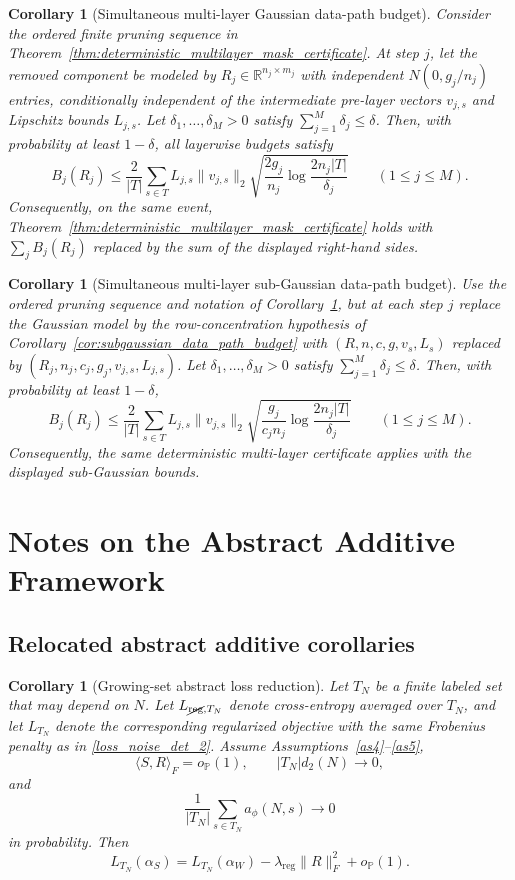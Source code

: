 \documentclass[11pt]{article}
\theoremstyle{plain}
\newtheorem{cor}[thm]{Corollary}
\theoremstyle{definition}
\theoremstyle{remark}
\newcommand{\R}{\mathbb{R}}
\newcommand{\PP}{\mathbb{P}}
\newcommand{\1}{\mathbf{1}}
\begin{document}
\begin{cor}[Simultaneous multi-layer Gaussian data-path budget]
\label{cor:multilayer_gaussian_data_path_budget}
Consider the ordered finite pruning sequence in Theorem~\ref{thm:deterministic_multilayer_mask_certificate}. At step \(j\), let the removed component be modeled by \(R_j\in\R^{n_j\times m_j}\) with independent \(N(0,g_j/n_j)\) entries, conditionally independent of the intermediate pre-layer vectors \(v_{j,s}\) and Lipschitz bounds \(L_{j,s}\). Let \(\delta_1,\dots,\delta_M>0\) satisfy \(\sum_{j=1}^M\delta_j\le\delta\). Then, with probability at least \(1-\delta\), all layerwise budgets satisfy
\[
B_j(R_j)
\le
\frac2{|T|}
\sum_{s\in T}
L_{j,s}\|v_{j,s}\|_2
\sqrt{
\frac{2g_j}{n_j}\log\frac{2n_j|T|}{\delta_j}
}
\qquad
(1\le j\le M).
\]
Consequently, on the same event, Theorem~\ref{thm:deterministic_multilayer_mask_certificate} holds with \(\sum_jB_j(R_j)\) replaced by the sum of the displayed right-hand sides.
\end{cor}

\begin{cor}[Simultaneous multi-layer sub-Gaussian data-path budget]
\label{cor:multilayer_subgaussian_data_path_budget}
Use the ordered pruning sequence and notation of Corollary~\ref{cor:multilayer_gaussian_data_path_budget}, but at each step \(j\) replace the Gaussian model by the row-concentration hypothesis of Corollary~\ref{cor:subgaussian_data_path_budget} with \((R,n,c,g,v_s,L_s)\) replaced by \((R_j,n_j,c_j,g_j,v_{j,s},L_{j,s})\). Let \(\delta_1,\dots,\delta_M>0\) satisfy \(\sum_{j=1}^M\delta_j\le\delta\). Then, with probability at least \(1-\delta\),
\[
B_j(R_j)
\le
\frac2{|T|}
\sum_{s\in T}
L_{j,s}\|v_{j,s}\|_2
\sqrt{
\frac{g_j}{c_jn_j}\log\frac{2n_j|T|}{\delta_j}
}
\qquad
(1\le j\le M).
\]
Consequently, the same deterministic multi-layer certificate applies with the displayed sub-Gaussian bounds.
\end{cor}

\section{Notes on the Abstract Additive Framework}
\label{app:abstract_additive_notes}

\subsection{Relocated abstract additive corollaries}
\label{app:abstract_relocated_corollaries}

\begin{cor}[Growing-set abstract loss reduction]
\label{cor:growing_set_abstract_loss}
Let \(T_N\) be a finite labeled set that may depend on \(N\). Let \(L_{\cancel{\mathrm{reg}},T_N}\) denote cross-entropy averaged over \(T_N\), and let \(L_{T_N}\) denote the corresponding regularized objective with the same Frobenius penalty as in \eqref{loss_noise_det_2}. Assume Assumptions~\ref{as4}--\ref{as5},
\[
\langle S,R\rangle_F=o_{\PP}(1),
\qquad
|T_N|d_2(N)\to0,
\]
and
\[
\frac{1}{|T_N|}\sum_{s\in T_N}a_\phi(N,s)\to0
\]
in probability. Then
\[
L_{T_N}(\alpha_S)
=
L_{T_N}(\alpha_W)
-\lambda_{\mathrm{reg}}\|R\|_F^2
+o_{\PP}(1).
\]
\end{cor}
\end{document}
